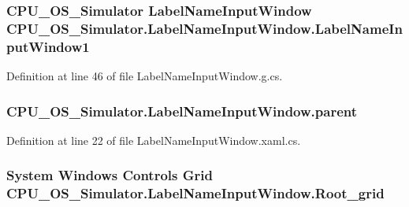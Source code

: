 \subsubsection[{Label\+Name\+Input\+Window1}]{\setlength{\rightskip}{0pt plus 5cm}C\+P\+U\+\_\+\+O\+S\+\_\+\+Simulator {\bf Label\+Name\+Input\+Window} C\+P\+U\+\_\+\+O\+S\+\_\+\+Simulator.\+Label\+Name\+Input\+Window.\+Label\+Name\+Input\+Window1\hspace{0.3cm}{\ttfamily [package]}}\label{class_c_p_u___o_s___simulator_1_1_label_name_input_window_ae2f7a4e3127730ff88d884ac33aee1b9}


Definition at line 46 of file Label\+Name\+Input\+Window.\+g.\+cs.

\hypertarget{class_c_p_u___o_s___simulator_1_1_label_name_input_window_abaa496579fc3e72440fac2324bbebfd9}{}
\subsubsection[{parent}]{ C\+P\+U\+\_\+\+O\+S\+\_\+\+Simulator.\+Label\+Name\+Input\+Window.\+parent\hspace{0.3cm}{\ttfamily [private]}}\label{class_c_p_u___o_s___simulator_1_1_label_name_input_window_abaa496579fc3e72440fac2324bbebfd9}


Definition at line 22 of file Label\+Name\+Input\+Window.\+xaml.\+cs.

\hypertarget{class_c_p_u___o_s___simulator_1_1_label_name_input_window_a7946e0fa5aa75a769ad4305a82f04fae}{}
\subsubsection[{Root\+\_\+grid}]{\setlength{\rightskip}{0pt plus 5cm}System Windows Controls Grid C\+P\+U\+\_\+\+O\+S\+\_\+\+Simulator.\+Label\+Name\+Input\+Window.\+Root\+\_\+grid\hspace{0.3cm}{\ttfamily [package]}}\label{class_c_p_u___o_s___simulator_1_1_label_name_input_window_a7946e0fa5aa75a769ad4305a82f04fae}


